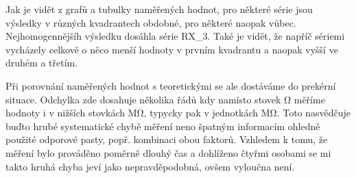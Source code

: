 Jak je vidět z grafů a tubulky naměřených hodnot, pro některé série jsou výsledky v různých kvadrantech obdobné, pro některé naopak vůbec. Nejhomogennějšíh výsledku dosáhla série RX\_3. Také je vidět, že napříč sériemi vycházely celkově o něco menší hodnoty v prvním kvadrantu a naopak vyšší ve druhém a třetím. 

Při porovnání naměřených hodnot s teoretickými se ale dostáváme do prekérní situace. Odchylka zde dosahuje několika řádů kdy namísto stovek \unit{\ohm} měříme hodnoty i v nižších stovkách \unit{\mega\ohm}, typycky pak v jednotkách \unit{\mega\ohm}. Toto nasvědčuje buďto hrubé systematické chybě měření neno špatným informacím ohledně použité odporové pasty, popř. kombinaci obou faktorů. Vzhledem k tomu, že měření bylo prováděno poměrně dlouhý čas a dohlíženo čtyřmi osobami se mi takto hruhá chyba jeví jako nepravděpodobná, ovšem vyloučna není. 